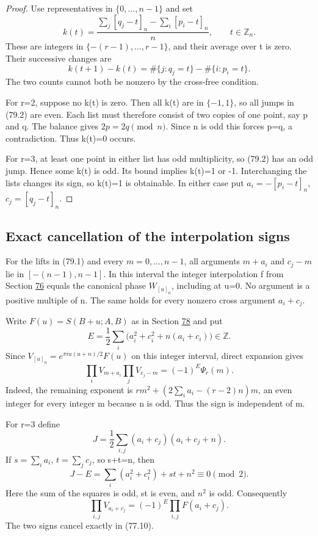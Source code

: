 \documentclass[11pt,reqno]{amsart}
\theoremstyle{plain}
\begin{document}
\begin{proof}
Use representatives in \(\{0,\ldots,n-1\}\) and set
\[
 k(t)=\frac{\sum_j[q_j-t]_n-\sum_i[p_i-t]_n}{n},
 \qquad t\in\mathbb Z_n.
\]
These are integers in \(\{-(r-1),\ldots,r-1\}\), and
their average over t is zero. Their successive changes are
\begin{equation*}
 k(t+1)-k(t)=\#\{j:q_j=t\}-\#\{i:p_i=t\}.
 \tag{79.2}
\end{equation*}
The two counts cannot both be nonzero by the cross-free condition.

For r=2, suppose no k(t) is zero. Then all k(t) are in
\(\{-1,1\}\), so all jumps in (79.2) are even. Each list
must therefore consist of two copies of one point, say p and q.
The balance gives \(2p=2q\pmod n\). Since n is odd this
forces p=q, a contradiction. Thus k(t)=0 occurs.

For r=3, at least one point in either list has odd multiplicity,
so (79.2) has an odd jump. Hence some k(t) is odd. Its bound
implies k(t)=1 or -1. Interchanging the lists changes its sign,
so k(t)=1 is obtainable. In either case put
\(a_i=-[p_i-t]_n\), \(c_j=[q_j-t]_n\).
\end{proof}

\subsection{Exact cancellation of the interpolation signs}\label{sec:79.2}

For the lifts in (79.1) and every \(m=0,\ldots,n-1\), all
arguments \(m+a_i\) and \(c_j-m\) lie in
\([-(n-1),n-1]\). In this interval the integer interpolation
f from Section \hyperref[sec:76]{76} equals the canonical phase \(W_{[u]_n}\),
including at u=0. No argument is a positive multiple of n.
The same holds for every nonzero cross argument \(a_i+c_j\).

Write \(F(u)=S(B+u;A,B)\) as in Section \hyperref[sec:78]{78} and put
\[
 E=\frac12\sum_i\bigl(a_i^2+c_i^2+n(a_i+c_i)\bigr)
 \in\mathbb Z.
\]
Since \(V_{[u]_n}=e^{\pi iu(u+n)/2}F(u)\) on this
integer interval, direct expansion gives
\begin{equation*}
 \prod_iV_{m+a_i}\prod_jV_{c_j-m}=(-1)^E\Psi_r(m).
 \tag{79.3}
\end{equation*}
Indeed, the remaining exponent is
\(rm^2+(2\sum_i a_i-(r-2)n)m\), an even integer for every
integer m because n is odd. Thus the sign is independent of m.

For r=3 define
\[
 J=\frac12\sum_{i,j}(a_i+c_j)(a_i+c_j+n).
\]
If \(s=\sum_i a_i\), \(t=\sum_jc_j\), so s+t=n, then
\[
 J-E=\sum_i(a_i^2+c_i^2)+st+n^2\equiv0\pmod2.
\]
Here the sum of the squares is odd, st is even, and \(n^2\)
is odd. Consequently
\begin{equation*}
 \prod_{i,j}V_{a_i+c_j}=(-1)^E\prod_{i,j}F(a_i+c_j).
 \tag{79.4}
\end{equation*}
The two signs cancel exactly in (77.10).
\end{document}
